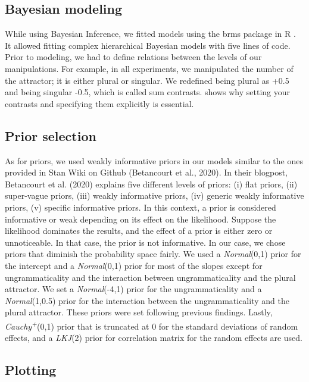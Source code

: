 \subsection{Bayesian modeling}

While using Bayesian Inference, we fitted models using the brms package in R \citep{R-brms_a, R-brms_b}. It allowed fitting complex hierarchical Bayesian models with five lines of code. Prior to modeling, we had to define relations between the levels of our manipulations. For example, in all experiments, we manipulated the number of the attractor; it is either plural or singular. We redefined being plural as +0.5 and being singular -0.5, which is called sum contrasts.  shows why setting your contrasts and specifying them explicitly is essential.

\subsection{Prior selection}

As for priors, we used weakly informative priors in our models similar to the ones provided in Stan Wiki on Github (Betancourt et al., 2020). In their blogpost, Betancourt et al. (2020) explains five different levels of priors: 
(i) flat priors, 
(ii) super-vague priors, 
(iii) weakly informative priors, 
(iv) generic weakly informative priors, 
(v) specific informative priors. 
In this context, a prior is considered informative or weak depending on its effect on the likelihood. Suppose the likelihood dominates the results, and the effect of a prior is either zero or unnoticeable. In that case, the prior is not informative. In our case, we chose priors that diminish the probability space fairly. We used a \emph{Normal}(0,1) prior for the intercept and a \emph{Normal}(0,1) prior for most of the slopes except for ungrammaticality and the interaction between ungrammaticality and the plural attractor. We set a \emph{Normal}(-4,1) prior for the ungrammaticality and a \emph{Normal}(1,0.5) prior for the interaction between the ungrammaticality and the plural attractor. These priors were set following previous findings. Lastly, \emph{Cauchy\textsuperscript{+}}(0,1) prior that is truncated at 0 for the standard deviations of random effects, and a \emph{LKJ}(2) prior for correlation matrix for the random effects are used.


\subsection{Plotting}

